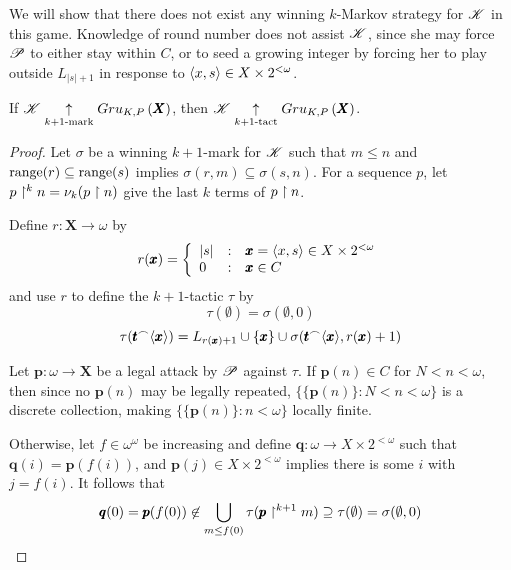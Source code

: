 We will show that there does not exist any winning $k$-Markov strategy for
$\mathscr{K}$ in this game. Knowledge of round number does not assist $\mathscr{K}$,
since she may force $\mathscr{P}$ to either stay within $C$, or to seed a growing
integer by forcing her to play outside $L_{|s|+1}$ in response to
$\langle x,s\rangle\in X\times 2^{<\omega}$.

\begin{lem}
  If $\mathscr{K}\underset{k+1\text{-mark}}{\uparrow}Gru_{K,P}\left({\pmb X}\right)$, then
  $\mathscr{K}\underset{k+1\text{-tact}}{\uparrow}Gru_{K,P}\left({\pmb X}\right)$.
\end{lem}

\begin{proof}
  Let $\sigma$ be a winning $k+1$-mark for $\mathscr{K}$ such that $m\leq n$ and
  $\text{range}(r) \subseteq \text{range}(s)$ implies $\sigma(r,m)\subseteq\sigma(s,n)$.
  For a sequence $p$, let $p\restriction^k n=\nu_k(p\restriction n)$ give the last $k$
  terms of $p\restriction n$.

  Define $r:\pmb X\to\omega$ by
    \[
      r(\pmb x)
        =
      \left\{
        \begin{array}{lcl}
          |s|
        & : &
          \pmb x = \langle x,s\rangle \in X\times 2^{<\omega}
        \\
          0
        & : &
          \pmb x \in C
        \end{array}
      \right.
    \]
  and use $r$ to define the $k+1$-tactic $\tau$ by
    \[
      \tau(\emptyset)
        =
      \sigma(\emptyset,0)
    \]
    \[
      \tau(\pmb t{^\frown}\langle\pmb x\rangle)
        =
      L_{r(\pmb x)+1}
        \cup
      \{\pmb x\}
        \cup
      \sigma(\pmb t{^\frown}\langle\pmb x\rangle,r(\pmb x)+1)
    \]

  Let $\pmb p:\omega\to\pmb X$ be a legal attack by $\mathscr{P}$ against $\tau$.
  If $\pmb p(n)\in C$ for $N<n<\omega$, then since no $\pmb p(n)$ may be legally
  repeated, $\{\{\pmb p(n)\}:N<n<\omega\}$ is a discrete collection, making
  $\{\{\pmb p(n)\}:n<\omega\}$ locally finite.

  Otherwise, let $f\in\omega^\omega$ be increasing and define
  $\pmb q:\omega\to X\times 2^{<\omega}$ such that $\pmb q(i)=\pmb p(f(i))$,
  and $\pmb p(j)\in X\times 2^{<\omega}$ implies there is some $i$ with $j=f(i)$.
  It follows that
    \[
      \pmb q(0)
        =
      \pmb p(f(0))
        \not\in
      \bigcup_{m\leq f(0)}\tau(\pmb p \restriction^{k+1} m)
        \supseteq
      \tau(\emptyset)
        =
      \sigma(\emptyset,0)
    \]


\end{proof}
